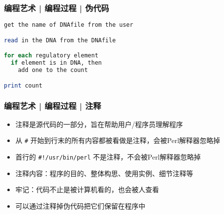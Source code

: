 \begin{frame}[fragile]
  \frametitle{编程艺术 | 编程过程 | \alert{伪代码}}
\begin{lstlisting}[language=Perl]
get the name of DNAfile from the user

read in the DNA from the DNAfile

for each regulatory element
  if element is in DNA, then
    add one to the count

print count
\end{lstlisting}
\end{frame}

\begin{frame}[fragile]
  \frametitle{编程艺术 | 编程过程 | \alert{注释}}
  \begin{itemize}
    \item 注释是源代码的一部分，旨在帮助用户/程序员理解程序
    \item 从 \verb|#| 开始到行末的所有内容都被看做是注释，会被Perl解释器忽略掉
    \item 首行的 \verb|#!/usr/bin/perl| 不是注释，不会被Perl解释器忽略掉
    \item 注释内容：程序的目的、整体构思、使用实例、细节注释等
    \item 牢记：代码不止是被计算机看的，也会被人查看
    \item 可以通过注释掉伪代码把它们保留在程序中
  \end{itemize}
\end{frame}

